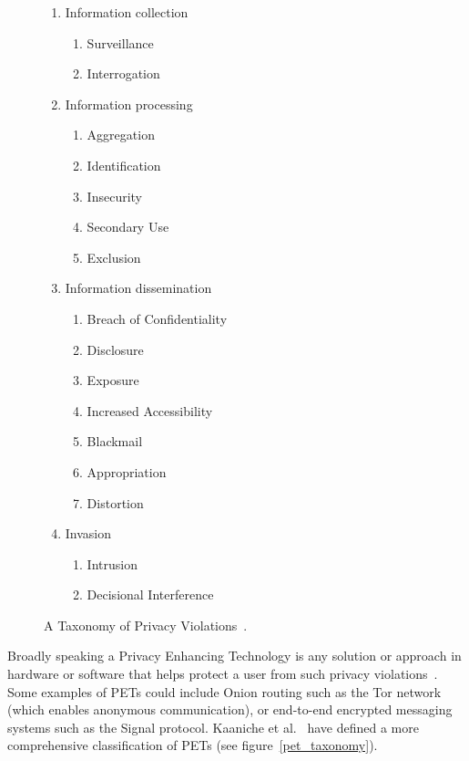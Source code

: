 \documentclass[
    author={Jacob Daniel Halsey},
    supervisor={Prof. Awais Rashid},
    degree={BSc},
    title={Building a Testbed for Evaluating Privacy Enhancing Technologies  (PETs)},
    subtitle={},
    type={software development},
    year={2021}
]{dissertation}
\begin{document}
\begin{figure}
	\centering
	\parbox{7cm}{
		\begin{enumerate}
			\item Information collection
			\begin{enumerate}
				\item Surveillance
				\item Interrogation 
			\end{enumerate}
			\item Information processing
			\begin{enumerate}
				\item Aggregation
				\item Identification
				\item Insecurity
				\item Secondary Use
				\item Exclusion
			\end{enumerate}
		\end{enumerate}
	}
	\qquad
	\begin{minipage}{7cm}
		\begin{enumerate}
			\setcounter{enumi}{2}
			\item Information  dissemination
			\begin{enumerate}
				\item Breach of Confidentiality
				\item Disclosure
				\item Exposure
				\item Increased Accessibility
				\item Blackmail
				\item Appropriation
				\item Distortion
			\end{enumerate}
			\item Invasion
			\begin{enumerate}
				\item Intrusion
				\item Decisional Interference
			\end{enumerate} 
		\end{enumerate}
	\end{minipage}
	\caption{A Taxonomy of Privacy Violations~\cite{solove_privacy}.}
	\label{privacy_taxonomy}
\end{figure}

Broadly speaking a Privacy Enhancing Technology is any solution or approach in hardware or software that helps
protect a user from such privacy violations~\cite{buckley_pets}. Some examples of PETs could include 
Onion routing such as the Tor network (which enables anonymous communication), or
end-to-end encrypted messaging systems such as the Signal protocol. 
Kaaniche et al.~\cite{kaaniche_2020_privacy} have defined a more comprehensive classification of PETs
(see figure~\ref{pet_taxonomy}).
\end{document}

